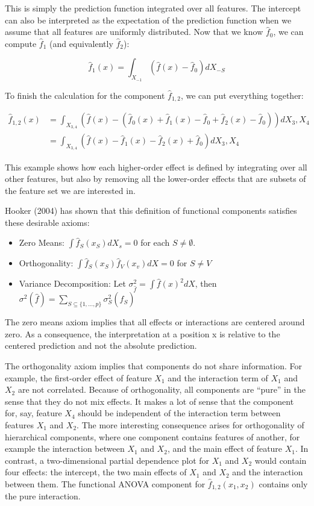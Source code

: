 \documentclass[
  11pt,
]{scrbook}
\providecommand{\tightlist}{%
  \setlength{\itemsep}{0pt}\setlength{\parskip}{0pt}}
\begin{document}
This is simply the prediction function integrated over all features.
The intercept can also be interpreted as the expectation of the prediction function when we assume that all features are uniformly distributed.
Now that we know \(\hat{f}_0\), we can compute \(\hat{f}_1\) (and equivalently \(\hat{f}_2\)):

\[\hat{f}_1(x) = \int_{X_{-1}} \left( \hat{f}(x) - \hat{f}_0\right) d X_{-S}\]

To finish the calculation for the component \(\hat{f}_{1,2}\), we can put everything together:

\begin{align*}\hat{f}_{1,2}(x) &= \int_{X_{3,4}} \left( \hat{f}(x) - (\hat{f}_0(x) + \hat{f}_1(x) - \hat{f}_0 + \hat{f}_2(x) - \hat{f}_0)\right) d X_{3},X_4 \\  &= \int_{X_{3,4}} \left(\hat{f}(x) - \hat{f}_1(x) - \hat{f}_2(x) + \hat{f}_0\right) d X_{3},X_4 \end{align*}

This example shows how each higher-order effect is defined by integrating over all other features, but also by removing all the lower-order effects that are subsets of the feature set we are interested in.

Hooker (2004) has shown that this definition of functional components satisfies these desirable axioms:

\begin{itemize}
\tightlist
\item
  Zero Means: \(\int{}\hat{f}_S(x_S)dX_s=0\) for each \(S\neq\emptyset\).
\item
  Orthogonality: \(\int{}\hat{f}_S(x_S)\hat{f}_V(x_v)dX=0\) for \(S\neq{}V\)
\item
  Variance Decomposition: Let \(\sigma^2_{\hat{f}}=\int \hat{f}(x)^2dX\), then \(\sigma^2(\hat{f}) = \sum_{S \subseteq \{1,\ldots,p\}} \sigma^2_S(\hat{f}_S)\)
\end{itemize}

The zero means axiom implies that all effects or interactions are centered around zero.
As a consequence, the interpretation at a position x is relative to the centered prediction and not the absolute prediction.

The orthogonality axiom implies that components do not share information.
For example, the first-order effect of feature \(X_1\) and the interaction term of \(X_{1}\) and \(X_2\) are not correlated.
Because of orthogonality, all components are ``pure'' in the sense that they do not mix effects.
It makes a lot of sense that the component for, say, feature \(X_4\) should be independent of the interaction term between features \(X_1\) and \(X_2\).
The more interesting consequence arises for orthogonality of hierarchical components, where one component contains features of another, for example the interaction between \(X_1\) and \(X_2\), and the main effect of feature \(X_1\).
In contrast, a two-dimensional partial dependence plot for \(X_1\) and \(X_2\) would contain four effects: the intercept, the two main effects of \(X_1\) and \(X_2\) and the interaction between them.
The functional ANOVA component for \(\hat{f}_{1,2}(x_1,x_2)\) contains only the pure interaction.
\end{document}
